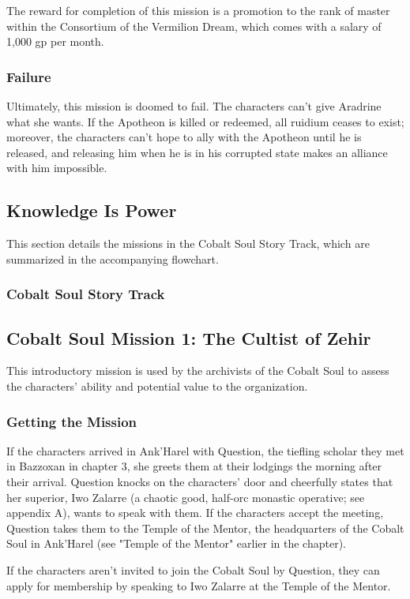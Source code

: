 \documentclass[10pt,a4paper,twoside,twocolumn,openany,nodeprecatedcode]{dndbook}
\begin{document}
The reward for completion of this mission is a promotion to the rank of master within the Consortium of the Vermilion Dream, which comes with a salary of 1,000 gp per month.

\subsubsection{Failure}
Ultimately, this mission is doomed to fail. The characters can't give Aradrine what she wants. If the Apotheon is killed or redeemed, all ruidium ceases to exist; moreover, the characters can't hope to ally with the Apotheon until he is released, and releasing him when he is in his corrupted state makes an alliance with him impossible.

\subsection{Knowledge Is Power}
This section details the missions in the Cobalt Soul Story Track, which are summarized in the accompanying flowchart.

\subsubsection{Cobalt Soul Story Track}
\subsection{Cobalt Soul Mission 1: The Cultist of Zehir}
This introductory mission is used by the archivists of the Cobalt Soul to assess the characters' ability and potential value to the organization.

\subsubsection{Getting the Mission}
If the characters arrived in Ank'Harel with Question, the tiefling scholar they met in Bazzoxan in chapter 3, she greets them at their lodgings the morning after their arrival. Question knocks on the characters' door and cheerfully states that her superior, Iwo Zalarre (a chaotic good, half-orc monastic operative; see appendix A), wants to speak with them. If the characters accept the meeting, Question takes them to the Temple of the Mentor, the headquarters of the Cobalt Soul in Ank'Harel (see "Temple of the Mentor" earlier in the chapter).

If the characters aren't invited to join the Cobalt Soul by Question, they can apply for membership by speaking to Iwo Zalarre at the Temple of the Mentor.
\end{document}
